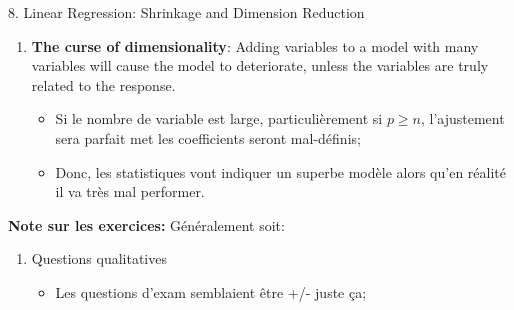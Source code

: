 \documentclass[12pt, titlepage, french]{report}
\begin{document}
\begin{CHPT_SUMM}{8. Linear Regression:  Shrinkage and Dimension Reduction}
\begin{enumerate}
\begin{enumerate}
\begin{itemize}
			\item	Les $\phi_{ji}$ sont surnommés les \textbf{loadings} et les $z_{i1}$ les \textbf{principal component scores};
			\item	Les \textit{scores} sont la distance entre les points et les \textit{principal components};
			\item	La \textbf{régression} de principal components (PCR) est \textbf{sur les principal components};
			\item	Puisqu'ils sont des moyennes pondérées de toutes les variables, PCR ne \textbf{fait pas la sélection de variable} et est semblable à la régression ridge dans ce sens;
			\item	Le plus de composantes, le plus faible le biais et le plus élevé la variance.
		\end{itemize}
		\item	\textbf{Partial Least Squares}: méthode \textit{supervisée};
		\begin{itemize}
			\item	Puisque la variable réponse est prise en compte, la direction n'est pas aussi bien ajusté;
			\item	Les prédicteurs cependant seront mieux à expliquer la réponse;
			\item	Réduit le biais en comparaison au PCA, mais augmente la variance et donc n'est pas globalement supérieur au PCA.
		\end{itemize}
	\end{enumerate}
	\item	\textbf{The curse of dimensionality}: Adding variables to a model with many variables will cause the model to deteriorate, unless the variables are truly related to the response.
	\begin{itemize}
		\item	Si le nombre de variable est large, particulièrement si $p \ge n$, l'ajustement sera parfait met les coefficients seront mal-définis;
		\item	Donc, les statistiques vont indiquer un superbe modèle alors qu'en réalité il va très mal performer.
	\end{itemize}
\end{enumerate}
\textbf{Note sur les exercices:} Généralement soit:
\begin{enumerate}
	\item	Questions qualitatives
	\begin{itemize}
		\item	Les questions d'exam semblaient être  +/- juste ça;

\end{itemize}
\end{enumerate}
\end{CHPT_SUMM}
\end{document}
